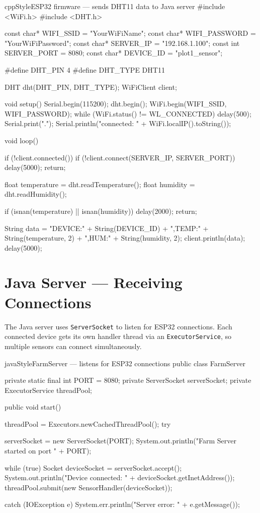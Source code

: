 \documentclass[12pt, a4paper]{report}
\begin{document}
\begin{codeblock}{cppStyle}{ESP32 firmware --- sends DHT11 data to Java server}
#include <WiFi.h>
#include <DHT.h>

const char* WIFI_SSID     = "YourWiFiName";
const char* WIFI_PASSWORD = "YourWiFiPassword";
const char* SERVER_IP     = "192.168.1.100";
const int   SERVER_PORT   = 8080;
const char* DEVICE_ID     = "plot1_sensor";

#define DHT_PIN  4
#define DHT_TYPE DHT11

DHT dht(DHT_PIN, DHT_TYPE);
WiFiClient client;

void setup() {
    Serial.begin(115200);
    dht.begin();
    WiFi.begin(WIFI_SSID, WIFI_PASSWORD);
    while (WiFi.status() != WL_CONNECTED) {
        delay(500);
        Serial.print(".");
    }
    Serial.println("\nWiFi connected: " + WiFi.localIP().toString());
}

void loop() {
    if (!client.connected()) {
        if (!client.connect(SERVER_IP, SERVER_PORT)) {
            delay(5000);
            return;
        }
    }

    float temperature = dht.readTemperature();
    float humidity    = dht.readHumidity();

    if (isnan(temperature) || isnan(humidity)) {
        delay(2000);
        return;
    }

    String data = "DEVICE:" + String(DEVICE_ID)
                + ",TEMP:"  + String(temperature, 2)
                + ",HUM:"   + String(humidity, 2);
    client.println(data);
    delay(5000);
}
\end{codeblock}

\section{Java Server --- Receiving Connections}

The Java server uses \texttt{ServerSocket} to listen for ESP32 connections. Each connected device gets its own handler thread via an \texttt{ExecutorService}, so multiple sensors can connect simultaneously.

\begin{codeblock}{javaStyle}{FarmServer --- listens for ESP32 connections}
public class FarmServer {
    private static final int PORT = 8080;
    private ServerSocket serverSocket;
    private ExecutorService threadPool;

    public void start() {
        threadPool = Executors.newCachedThreadPool();
        try {
            serverSocket = new ServerSocket(PORT);
            System.out.println("Farm Server started on port " + PORT);

            while (true) {
                Socket deviceSocket = serverSocket.accept();
                System.out.println("Device connected: "
                    + deviceSocket.getInetAddress());
                threadPool.submit(new SensorHandler(deviceSocket));
            }
        } catch (IOException e) {
            System.err.println("Server error: " + e.getMessage());
        }
    }
}
\end{codeblock}
\end{document}
